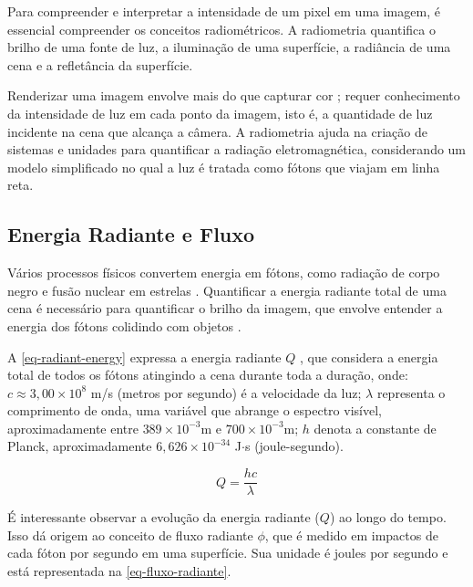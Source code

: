 \documentclass[english, 
               brazil, 
               bsc] %
               {dcomp-abntex2}
\begin{document}
Para compreender e interpretar a intensidade de um pixel em uma imagem, é essencial compreender os conceitos radiométricos. A radiometria quantifica o brilho de uma fonte de luz, a iluminação de uma superfície, a radiância de uma cena e a refletância da superfície.


Renderizar uma imagem envolve mais do que capturar cor \cite{radiometry_color}; requer conhecimento da intensidade de luz em cada ponto da imagem, isto é, a quantidade de luz incidente na cena que alcança a câmera. A radiometria ajuda na criação de sistemas e unidades para quantificar a radiação eletromagnética, considerando um modelo simplificado no qual a luz é tratada como fótons que viajam em linha reta. 


\subsection{Energia Radiante e Fluxo} \label{fluxo}


Vários processos físicos convertem energia em fótons, como radiação de corpo negro e fusão nuclear em estrelas \cite{black_body_radiation}. Quantificar a energia radiante total de uma cena é necessário para quantificar o brilho da imagem, que envolve entender a energia dos fótons colidindo com objetos \cite{rendering_judice}.


A \autoref{eq-radiant-energy} expressa a energia radiante \( Q \) \cite{pbr}, que considera a energia total de todos os fótons atingindo a cena durante toda a duração, onde:  \( c  \approx 3,00 \times 10^8 \) m/s (metros por segundo) é a velocidade da luz; \( \lambda \) representa o comprimento de onda, uma variável que abrange o espectro visível, aproximadamente entre \( 389 \times 10^{-3} \)m e \(700 \times 10^{-3} \)m; \( h \) denota a constante de Planck, aproximadamente \( 6,626 \times 10^{-34} \) J$\cdot$s (joule-segundo).




\begin{equation}\label{eq-radiant-energy}
Q = \frac{hc}{\lambda}
\end{equation}






É interessante observar a evolução da energia radiante ($Q$) ao longo do tempo. Isso dá origem ao conceito de fluxo radiante $\phi$, que é medido em impactos de cada fóton por segundo em uma superfície. Sua unidade é joules por segundo e está representada na \autoref{eq-fluxo-radiante}.
\end{document}
